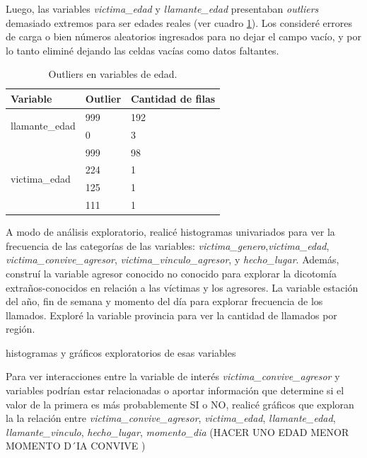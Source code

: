 \documentclass[10 pt]{article}
\begin{document}
 Luego, las variables \textit{victima\_edad} y \textit{llamante\_edad} presentaban \textit{outliers} demasiado extremos para ser edades reales (ver cuadro \ref{tabla_out}). Los consideré errores de carga o bien números aleatorios ingresados para no dejar el campo vacío, y por lo tanto eliminé dejando las celdas vacías como datos faltantes. 


\begin{table}[]
    \centering
    \caption{Outliers en variables de edad.}
    \label{tabla_out}
    \begin{tabular}{|l|l|l|}
    \hline
    \textbf{Variable}                        & \textbf{Outlier} & \textbf{Cantidad de filas} \\ \hline
    \multirow{2}{*}{llamante\_edad} & 999     & 192               \\ \cline{2-3} 
                                    & 0       & 3                 \\ \hline
    \multirow{4}{*}{victima\_edad}  & 999     & 98                \\ \cline{2-3} 
                                    & 224     & 1                 \\ \cline{2-3} 
                                    & 125     & 1                 \\ \cline{2-3} 
                                    & 111     & 1                 \\ \hline
    \end{tabular}
    \end{table}


A modo de análisis exploratorio, realicé histogramas univariados para ver la frecuencia de las categorías de las variables: \textit{victima\_genero},\textit{victima\_edad}, \textit{victima\_convive\_agresor}, \textit{victima\_vinculo\_agresor},  y \textit{hecho\_lugar}. Además, construí la variable agresor conocido no conocido para explorar la dicotomía extraños-conocidos en relación a las víctimas y los agresores. La variable estación del año, fin de semana y momento del día para explorar frecuencia de los llamados. Exploré la variable provincia para ver la cantidad de llamados por región. 

histogramas y gráficos exploratorios de esas variables

Para ver interacciones entre la variable de interés \textit{victima\_convive\_agresor} y variables podrían estar relacionadas o aportar información que determine si el valor de la primera es más probablemente SI o NO,  realicé gráficos que exploran la la relación entre \textit{victima\_convive\_agresor}, \textit{victima\_edad}, \textit{llamante\_edad}, \textit{llamante\_vinculo}, \textit{hecho\_lugar}, \textit{momento\_dia} (HACER UNO EDAD MENOR MOMENTO D´IA CONVIVE )
\end{document}
